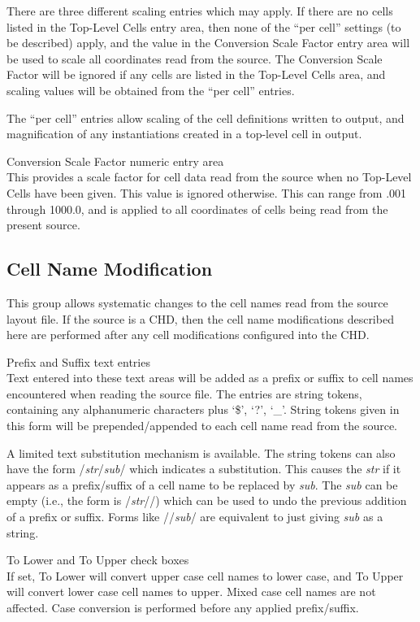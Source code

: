 There are three different scaling entries which may apply.  If there
are no cells listed in the {\cb Top-Level Cells} entry area, then none
of the ``per cell'' settings (to be described) apply, and the value in
the {\cb Conversion Scale Factor} entry area will be used to scale all
coordinates read from the source.  The {\cb Conversion Scale Factor}
will be ignored if any cells are listed in the {\cb Top-Level Cells}
area, and scaling values will be obtained from the ``per cell''
entries.

The ``per cell'' entries allow scaling of the cell definitions written
to output, and magnification of any instantiations created in a
top-level cell in output.

\begin{description}
\item{{\cb Conversion Scale Factor} numeric entry area}\\
This provides a scale factor for cell data read from the source when
no {\cb Top-Level Cells} have been given.  This value is ignored
otherwise.  This can range from .001 through 1000.0, and is applied to
all coordinates of cells being read from the present source.
\end{description}

\subsection{Cell Name Modification}

This group allows systematic changes to the cell names read from the
source layout file.  If the source is a CHD, then the cell name
modifications described here are performed after any cell
modifications configured into the CHD.

\begin{description}
\item{{\cb Prefix} and {\cb Suffix} text entries}\\
Text entered into these text areas will be added as a prefix or suffix
to cell names encountered when reading the source file.  The entries
are string tokens, containing any alphanumeric characters plus `\$',
`?', `\_'.  String tokens given in this form will be
prepended/appended to each cell name read from the source.

A limited text substitution mechanism is available.  The string tokens
can also have the form /{\it str\/}/{\it sub\/}/ which indicates a
substitution.  This causes the {\it str} if it appears as a
prefix/suffix of a cell name to be replaced by {\it sub}.  The {\it
sub} can be empty (i.e., the form is /{\it str\/}//) which can be used
to undo the previous addition of a prefix or suffix.  Forms like
//{\it sub\/}/ are equivalent to just giving {\it sub} as a string.

\item{{\cb To Lower} and {\cb To Upper} check boxes}\\
If set, {\cb To Lower} will convert upper case cell names to lower
case, and {\cb To Upper} will convert lower case cell names to upper. 
Mixed case cell names are not affected.  Case conversion is performed
before any applied prefix/suffix.
\end{description}

